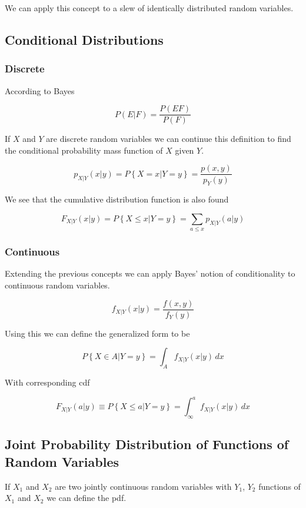     We can apply this concept to a slew of identically distributed random variables. %

    \subsection{Conditional Distributions}

        \subsubsection{Discrete}
        According to Bayes

        \[
            P\left( E|F \right) = \frac{P(EF)}{P(F)}
        \]

        If $X$ and $Y$ are discrete random variables we can continue this definition to find the conditional probability
        mass function of $X$ given $Y$.

        \[
            p_{X|Y}\left( x|y \right) = P\left\{ X = x | Y = y \right\} = \frac{p\left( x, y \right)}{p_Y(y)}
        \]

        We see that the cumulative distribution function is also found

        \[
            F_{X|Y}\left( x|y \right) = P\left\{ X \le x | Y = y \right\} = \sum_{a \le x} p_{X|Y}\left( a|y \right)
        \]

        \subsubsection{Continuous}
        Extending the previous concepts we can apply Bayes' notion of conditionality to continuous random variables.

        \[
            f_{X|Y}\left( x|y \right) = \frac{f\left( x, y \right)}{f_Y(y)}
        \]

        Using this we can define the generalized form to be

        \[
            P\left\{ X \in A|Y = y \right\} = \int_A f_{X|Y}\left( x|y \right)\,dx
        \]

        With corresponding cdf

        \[
            F_{X|Y}\left( a|y \right) \equiv P\left\{ X\le a | Y = y \right\} =
                \int_{\infty}^a f_{X|Y}\left( x|y \right) \, dx
        \]

    \subsection{Joint Probability Distribution of Functions of Random Variables}
    If $X_1$ and $X_2$ are two jointly continuous random variables with $Y_1$, $Y_2$ functions of $X_1$ and $X_2$ we can
    define the pdf.

